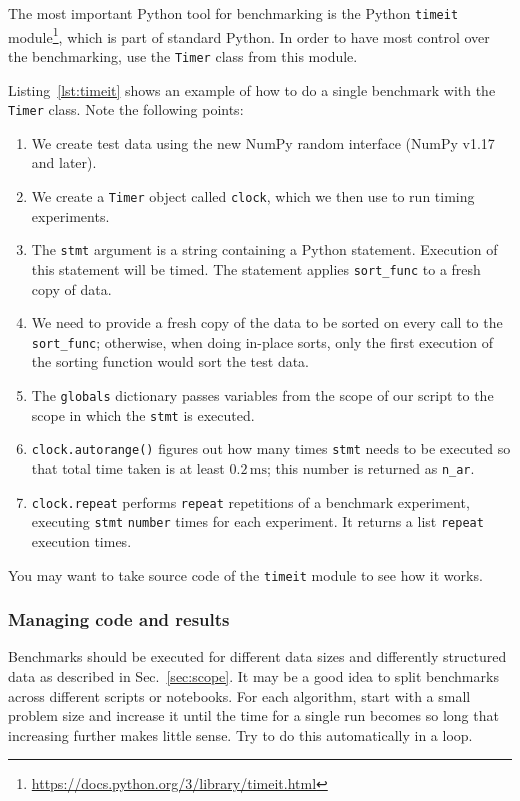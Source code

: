 \documentclass[sigconf, nonacm, natbib, screen, balance=False]{acmart}
\begin{document}
The most important Python tool for benchmarking is the Python
\verb!timeit!
module\footnote{\url{https://docs.python.org/3/library/timeit.html}},
which is part of standard Python. In order to have most control over
the benchmarking, use the \verb!Timer! class from this module.

Listing~\ref{lst:timeit} shows an example of how to do a single
benchmark with the \verb!Timer! class. Note the following points:
\begin{enumerate}
  \item We create test data using the new NumPy random interface
    (NumPy v1.17 and later). 
  \item We create a \verb!Timer! object called \verb!clock!, which we
    then use to run timing experiments.
  \item The \verb!stmt! argument is a string containing a Python
    statement. Execution of this statement will be timed. The
    statement applies \verb!sort_func! to a fresh copy of data.
  \item We need to provide a fresh copy of the data to be sorted on
    every call to the \verb!sort_func!; otherwise, when doing in-place
    sorts, only the first execution of the sorting function would sort
    the test data.
  \item The \verb!globals! dictionary passes variables from the scope
    of our script to the scope in which the \verb!stmt! is executed.
  \item \verb!clock.autorange()! figures out how many times
    \verb!stmt! needs to be executed so that total time taken is at
    least $0.2\,\text{ms}$; this number is returned as \verb!n_ar!.
  \item \verb!clock.repeat! performs \verb!repeat! repetitions of a
    benchmark experiment, executing \verb!stmt! \verb!number! times
    for each experiment. It returns a list \verb!repeat! execution
    times.
\end{enumerate}
You may want to take source code of the \verb!timeit! module to see
how it works.

\subsubsection{Managing code and results}

Benchmarks should be executed for different data sizes and differently
structured data as described in Sec.~\ref{sec:scope}. It may be a good
idea to split benchmarks across different scripts or notebooks. For
each algorithm, start with a small problem size and increase it until
the time for a single run becomes so long that increasing further
makes little sense. Try to do this automatically in a loop.
\end{document}
